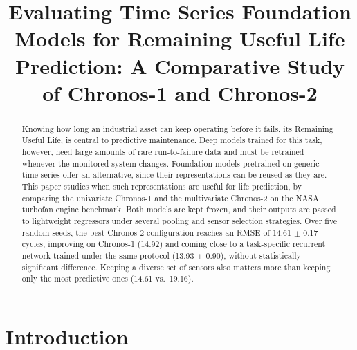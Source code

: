 \documentclass{svproc}
\begin{document}
\mainmatter

\title{Evaluating Time Series Foundation Models for Remaining Useful Life
Prediction: A Comparative Study of Chronos-1 and Chronos-2}
\author{}
\institute{}
\maketitle

\begin{center}\end{center}

\begin{abstract}
Knowing how long an industrial asset can keep operating before it fails,
its Remaining Useful Life, is central to predictive maintenance. Deep
models trained for this task, however, need large amounts of rare
run-to-failure data and must be retrained whenever the monitored system
changes. Foundation models pretrained on generic time series offer an
alternative, since their representations can be reused as they are. This
paper studies when such representations are useful for life prediction,
by comparing the univariate Chronos-1 and the multivariate Chronos-2 on
the NASA turbofan engine benchmark. Both models are kept frozen, and
their outputs are passed to lightweight regressors under several pooling
and sensor selection strategies. Over five random seeds, the best Chronos-2 configuration reaches an RMSE
of 14.61 $\pm$ 0.17 cycles, improving on Chronos-1 (14.92) and coming close
to a task-specific recurrent network trained under the same protocol
(13.93 $\pm$ 0.90), without statistically significant difference. Keeping a diverse set of sensors also matters more than keeping
only the most predictive ones (14.61 vs.\ 19.16).
\end{abstract}

\section{Introduction}
\end{document}
